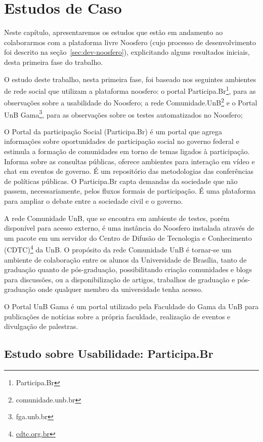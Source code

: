 \chapter{Estudos de Caso}

Neste capítulo, apresentaremos os estudos que estão em andamento ao colaborarmos com a plataforma livre Noosfero (cujo processo de desenvolvimento foi descrito na seção~\ref{sec:dev-noosfero}), explicitando alguns resultados iniciais, desta primeira fase do trabalho.

O estudo deste trabalho, nesta primeira fase, foi baseado nos seguintes ambientes de
rede social que utilizam a plataforma noosfero:
%
o portal Participa.Br\footnote{Participa.Br}, para as observações sobre a usabilidade do Noosfero;
%
a rede Comunidade.UnB\footnote{comunidade.unb.br} e o Portal UnB Gama\footnote{fga.unb.br}, para as observações sobre os testes automatizados no Noosfero;
%

O Portal da participação Social (Participa.Br) é um portal que agrega informações sobre oportunidades de participação social no governo federal e estimula a formação de comunidades em torno de temas ligados à participação.
%
Informa sobre as consultas públicas, oferece ambientes para interação em vídeo e chat em eventos de governo. É um repositório das metodologias das conferências de políticas públicas. O Participa.Br capta demandas da sociedade que não passem, necessariamente, pelos fluxos formais de participação. É uma plataforma para ampliar o debate entre a sociedade civil e o governo.

A rede Comunidade UnB, que se encontra em ambiente de testes, porém disponível para acesso externo, é uma instância do Noosfero instalada através de um pacote em um servidor do Centro de Difusão de Tecnologia e Conhecimento (CDTC)\footnote{\url{cdtc.org.br}} da UnB. O propósito da rede Comunidade UnB é tornar-se um ambiente de colaboração entre os alunos da Universidade de Brasília, tanto de graduação quanto de pós-graduação, possibilitando criação comunidades e blogs para discussões, ou a disponibilização de artigos, trabalhos de graduação e pós-graduação onde qualquer membro da universidade tenha acesso.

O Portal UnB Gama é um portal utilizado pela Faculdade do Gama da UnB para publicações de notícias sobre a própria faculdade, realização de eventos e divulgação de palestras.

\section {Estudo sobre Usabilidade: Participa.Br}

